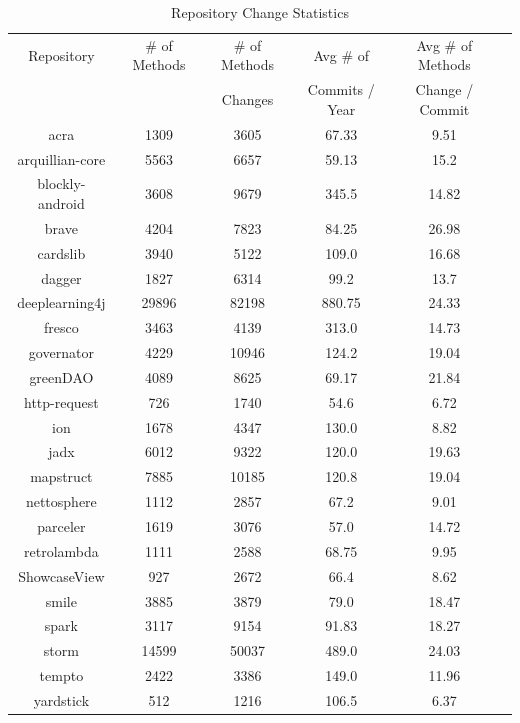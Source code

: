 \begin{table}
\begin{center}
    \begin{tabular}{|c|c|c|c|c|c|}
        \hline
        Repository & \# of Methods & \# of Methods & Avg \# of & Avg \# of Methods \\
         & & Changes & Commits / Year & Change / Commit \\
        \hline
        acra & 1309 & 3605 & 67.33 & 9.51 \\
        arquillian-core & 5563 & 6657 & 59.13 & 15.2 \\
        blockly-android & 3608 & 9679 & 345.5 & 14.82 \\
        brave & 4204 & 7823 & 84.25 & 26.98 \\
        cardslib & 3940 & 5122 & 109.0 & 16.68 \\
        dagger & 1827 & 6314 & 99.2 & 13.7 \\
        deeplearning4j & 29896 & 82198 & 880.75 & 24.33 \\
        fresco & 3463 & 4139 & 313.0 & 14.73 \\
        governator & 4229 & 10946 & 124.2 & 19.04 \\
        greenDAO & 4089 & 8625 & 69.17 & 21.84 \\
        http-request & 726 & 1740 & 54.6 & 6.72 \\
        ion & 1678 & 4347 & 130.0 & 8.82 \\
        jadx & 6012 & 9322 & 120.0 & 19.63 \\
        mapstruct & 7885 & 10185 & 120.8 & 19.04 \\
        nettosphere & 1112 & 2857 & 67.2 & 9.01 \\
        parceler & 1619 & 3076 & 57.0 & 14.72 \\
        retrolambda & 1111 & 2588 & 68.75 & 9.95 \\
        ShowcaseView & 927 & 2672 & 66.4 & 8.62 \\
        smile & 3885 & 3879 & 79.0 & 18.47 \\
        spark & 3117 & 9154 & 91.83 & 18.27 \\
        storm & 14599 & 50037 & 489.0 & 24.03 \\
        tempto & 2422 & 3386 & 149.0 & 11.96 \\
        yardstick & 512 & 1216 & 106.5 & 6.37 \\
        \hline
    \end{tabular}
\end{center}
\caption{Repository Change Statistics}
\label{tab:repository_stats}
\end{table}


